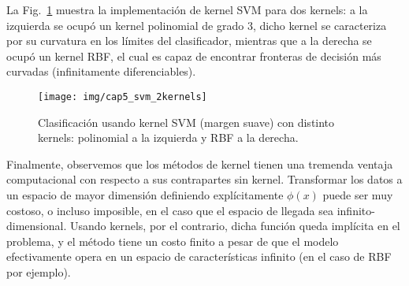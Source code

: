 La Fig.~\ref{fig:ksvm}  muestra la implementación de kernel SVM para dos kernels: a la izquierda se ocupó un kernel polinomial de grado $3$, dicho kernel se caracteriza por su curvatura en los límites del clasificador, mientras que a la derecha se ocupó un kernel RBF, el cual es capaz de encontrar fronteras de decisión más curvadas (infinitamente diferenciables).

\begin{figure}[ht]
    \centering
    \texttt{[image: img/cap5\_svm\_2kernels]}
    \caption{Clasificación usando kernel SVM (margen suave) con distinto kernels: polinomial a la izquierda y RBF a la derecha.}
    \label{fig:ksvm}
\end{figure}


Finalmente, observemos que los métodos de kernel tienen una tremenda ventaja computacional con respecto a sus contrapartes sin kernel. Transformar los datos a un espacio de mayor dimensión  definiendo explícitamente $\phi(x)$ puede ser muy costoso, o incluso imposible, en el caso que el espacio de llegada sea infinito-dimensional. Usando kernels, por el contrario, dicha función queda implícita en el problema, y el método tiene un costo finito a pesar de que el modelo efectivamente opera en un espacio de características infinito (en el caso de RBF por ejemplo).




